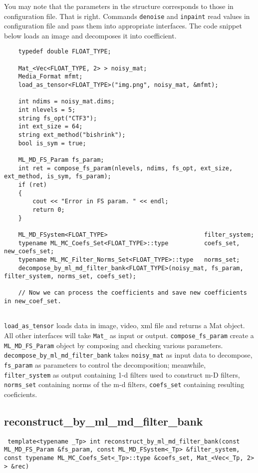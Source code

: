 \documentclass[a4paper,5pt]{article}
\begin{document}
You may note that the parameters in the structure corresponds to those in configuration file. That is right. Commands \lstinline{denoise} and \lstinline{inpaint} read values in configuration file and pass them into appropriate interfaces. The code snippet below loads an image and decomposes it into coefficient.

\begin{lstlisting}
	typedef double FLOAT_TYPE;

	Mat_<Vec<FLOAT_TYPE, 2> > noisy_mat;
	Media_Format mfmt;
	load_as_tensor<FLOAT_TYPE>("img.png", noisy_mat, &mfmt);
	
	int ndims = noisy_mat.dims;
	int nlevels = 5;
	string fs_opt("CTF3");
	int ext_size = 64;
	string ext_method("bishrink");
	bool is_sym = true;

	ML_MD_FS_Param fs_param;
	int ret = compose_fs_param(nlevels, ndims, fs_opt, ext_size, ext_method, is_sym, fs_param);
	if (ret)
	{
		cout << "Error in FS param. " << endl;
		return 0;
	}
	
	ML_MD_FSystem<FLOAT_TYPE> 					        filter_system;
	typename ML_MC_Coefs_Set<FLOAT_TYPE>::type 		    coefs_set, new_coefs_set;
	typename ML_MC_Filter_Norms_Set<FLOAT_TYPE>::type 	norms_set;
	decompose_by_ml_md_filter_bank<FLOAT_TYPE>(noisy_mat, fs_param, filter_system, norms_set, coefs_set);
	
	// Now we can process the coefficients and save new coefficients in new_coef_set.
	
\end{lstlisting}
  \lstinline{load_as_tensor} loads data in image, video, xml file and returns a Mat object. All other interfaces will take \lstinline{Mat_} as input or output.
  \lstinline{compose_fs_param} create a \lstinline{ML_MD_FS_Param} object by composing and checking various parameters.
  \lstinline{decompose_by_ml_md_filter_bank} takes \lstinline{noisy_mat} as input data to decompose, \lstinline{fs_param} as parameters to control the decomposition; meanwhile, \lstinline{ filter_system} as output containing 1-d filters used to construct m-D filters, \lstinline{norms_set} containing norms of the m-d filters, \lstinline{coefs_set} containing resulting coeficients. 


\subsection{reconstruct\_by\_ml\_md\_filter\_bank}

\lstinline{ template<typename _Tp> int reconstruct_by_ml_md_filter_bank(const ML_MD_FS_Param &fs_param, const ML_MD_FSystem<_Tp> &filter_system, const typename ML_MC_Coefs_Set<_Tp>::type &coefs_set, Mat_<Vec<_Tp, 2> > &rec) }
\end{document}
